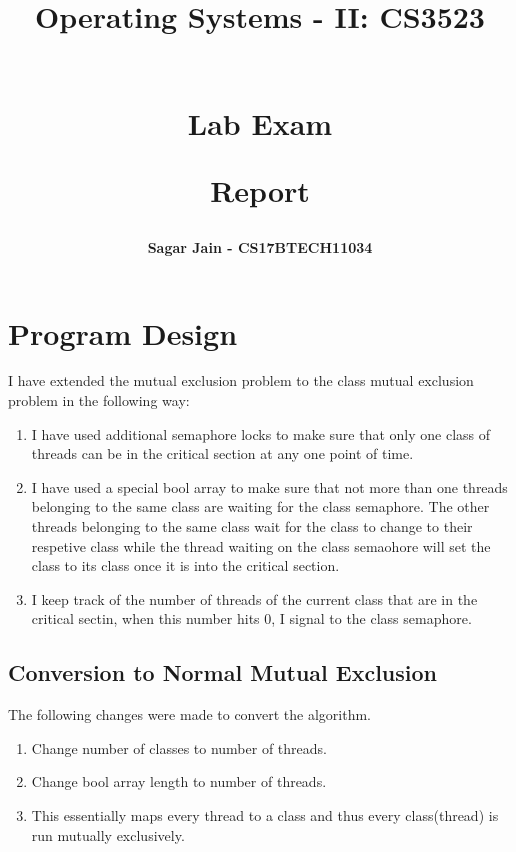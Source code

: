 \documentclass[a4paper,12pt]{report}
\begin{document}
\title{
\textbf{Operating Systems - II: CS3523}\\~\\
\begin{large}
\textbf{Lab Exam}\\
\end{large}
\begin{large}
\textbf{Report}
\end{large}
}
\author{\textbf{Sagar Jain - CS17BTECH11034}\\}
\maketitle
\begin{large}
\tableofcontents
\end{large}
\newpage
\section{Program Design}
I have extended the mutual exclusion problem to the class mutual exclusion problem in the following way:
\begin{enumerate}
\item I  have used additional semaphore locks to make sure that only one class of threads can be in the critical section at any one point of time.
\item I have used a special bool array to make sure that not more than one threads belonging to the same class are waiting for the class semaphore. The other threads belonging to the same class wait for  the class to change to their respetive class while the thread waiting on the class semaohore will set the class to its class once it is into the critical section.
\item I keep track of the number of threads of the current class that are in the critical sectin, when this number hits 0, I signal to the class semaphore.
\end{enumerate}
\subsection{Conversion to Normal Mutual Exclusion}
The following changes were made to convert the algorithm.
\begin{enumerate}
\item Change number of classes to number of threads.
\item Change bool array length to number of threads.
\item This essentially maps every thread to a class and thus every class(thread) is run mutually exclusively.
\end{enumerate}
\end{document}
